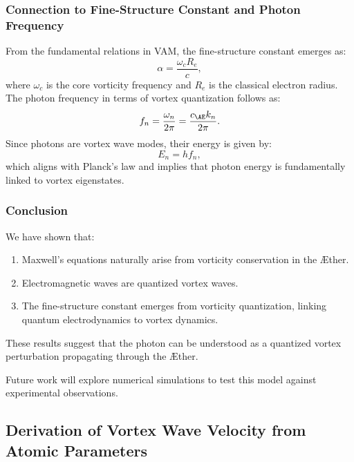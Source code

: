 \documentclass[a4paper,10pt]{article}
\begin{document}
\subsubsection*{Connection to Fine-Structure Constant and Photon Frequency}

From the fundamental relations in VAM, the fine-structure constant emerges as:
\begin{equation*}
    \alpha = \frac{\omega_c R_e}{c},
\end{equation*}
where $\omega_c$ is the core vorticity frequency and $R_e$ is the classical electron radius. The photon frequency in terms of vortex quantization follows as:
\begin{equation*}
    f_n = \frac{\omega_n}{2\pi} = \frac{c_{\AE} k_n}{2\pi}.
\end{equation*}
Since photons are vortex wave modes, their energy is given by:
\begin{equation*}
    E_n = h f_n,
\end{equation*}
which aligns with Planck's law and implies that photon energy is fundamentally linked to vortex eigenstates.

\subsubsection*{Conclusion}

We have shown that:
\begin{enumerate}
    \item Maxwell's equations naturally arise from vorticity conservation in the Æther.
    \item Electromagnetic waves are quantized vortex waves.
    \item The fine-structure constant emerges from vorticity quantization, linking quantum electrodynamics to vortex dynamics.
\end{enumerate}
These results suggest that the photon can be understood as a quantized vortex perturbation propagating through the Æther.

Future work will explore numerical simulations to test this model against experimental observations.

        \subsection{Derivation of Vortex Wave Velocity from Atomic Parameters}
\end{document}
